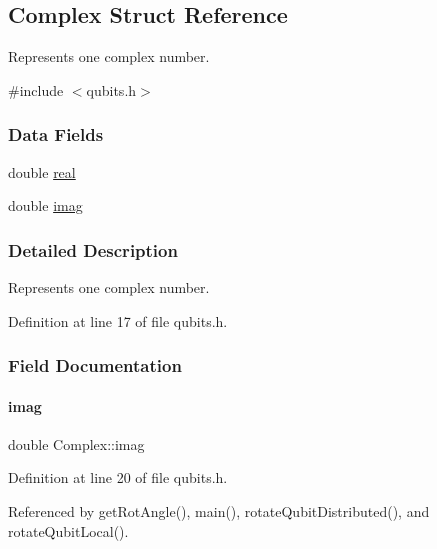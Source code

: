 \hypertarget{structComplex}{}\subsection{Complex Struct Reference}
\label{structComplex}


Represents one complex number.  




{\ttfamily \#include $<$qubits.\+h$>$}

\subsubsection*{Data Fields}
\begin{DoxyCompactItemize}
\item 
double \hyperlink{structComplex_a0138f5fe2b2c6180b8fcda77a7aa51c5}{real}
\item 
double \hyperlink{structComplex_a2bb90cc563599c3c8bdec9acf9ea40a6}{imag}
\end{DoxyCompactItemize}


\subsubsection{Detailed Description}
Represents one complex number. 

Definition at line 17 of file qubits.\+h.



\subsubsection{Field Documentation}
\mbox{\label{structComplex_a2bb90cc563599c3c8bdec9acf9ea40a6}} 
\paragraph{\texorpdfstring{imag}{imag}}
{\footnotesize\ttfamily double Complex\+::imag}



Definition at line 20 of file qubits.\+h.



Referenced by get\+Rot\+Angle(), main(), rotate\+Qubit\+Distributed(), and rotate\+Qubit\+Local().

\mbox{\label{structComplex_a0138f5fe2b2c6180b8fcda77a7aa51c5}} 
